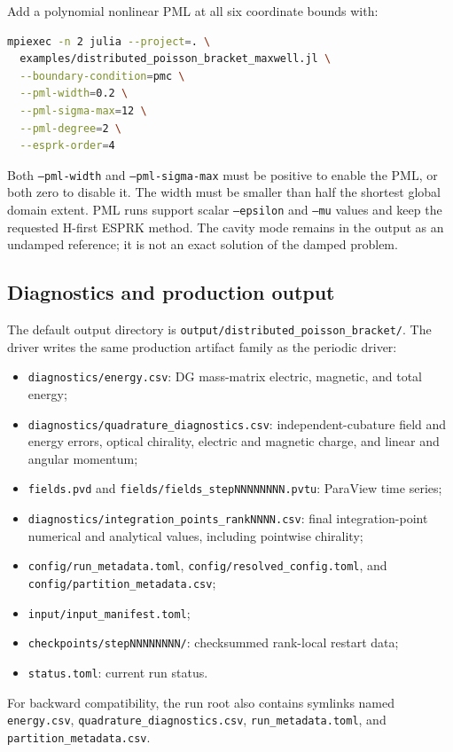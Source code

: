 \documentclass[11pt,oneside]{book}
\newcommand{\code}[1]{\texttt{#1}}
\begin{document}
Add a polynomial nonlinear PML at all six coordinate bounds with:
\begin{lstlisting}[language=bash]
mpiexec -n 2 julia --project=. \
  examples/distributed_poisson_bracket_maxwell.jl \
  --boundary-condition=pmc \
  --pml-width=0.2 \
  --pml-sigma-max=12 \
  --pml-degree=2 \
  --esprk-order=4
\end{lstlisting}
Both \code{--pml-width} and \code{--pml-sigma-max} must be positive to enable
the PML, or both zero to disable it. The width must be smaller than half the
shortest global domain extent. PML runs support scalar \code{--epsilon} and
\code{--mu} values and keep the requested H-first ESPRK method.
The cavity mode remains in the output as an undamped reference; it is not an
exact solution of the damped problem.

\subsection{Diagnostics and production output}

The default output directory is
\code{output/distributed\_poisson\_bracket/}. The driver writes the same
production artifact family as the periodic driver:
\begin{itemize}[leftmargin=*]
  \item \code{diagnostics/energy.csv}: DG mass-matrix electric, magnetic, and
        total energy;
  \item \code{diagnostics/quadrature\_diagnostics.csv}:
        independent-cubature field and energy errors, optical chirality,
        electric and magnetic charge, and linear and angular momentum;
  \item \code{fields.pvd} and \code{fields/fields\_stepNNNNNNNN.pvtu}:
        ParaView time series;
  \item \code{diagnostics/integration\_points\_rankNNNN.csv}: final
        integration-point numerical and analytical values, including pointwise
        chirality;
  \item \code{config/run\_metadata.toml},
        \code{config/resolved\_config.toml}, and
        \code{config/partition\_metadata.csv};
  \item \code{input/input\_manifest.toml};
  \item \code{checkpoints/stepNNNNNNNN/}: checksummed rank-local restart data;
  \item \code{status.toml}: current run status.
\end{itemize}
For backward compatibility, the run root also contains symlinks named
\code{energy.csv}, \code{quadrature\_diagnostics.csv},
\code{run\_metadata.toml}, and \code{partition\_metadata.csv}.
\end{document}
